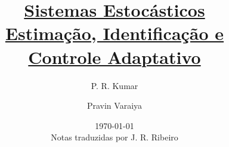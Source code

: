 \usepackage[T1]{fontenc}
\usepackage[utf8]{inputenc}
\usepackage[portuguese]{babel}
\usepackage[dvipsnames]{xcolor}
\usepackage[left=2cm,right=2cm,top=2cm,bottom=2cm]{geometry}
\usepackage{amsfonts,amssymb,amsmath,
txfonts,euler,
hyperref,
nomencl,
}
\usepackage[subnum]{cases}
\title{\href{http://cesg.tamu.edu/wp-content/uploads/2014/09/Kumar-Varaiya-Textbook.pdf}{Sistemas Estocásticos\\
Estimação, Identificação e \\
Controle Adaptativo}}
\author{P. R. Kumar \and Pravin Varaiya}
\date{\today\\Notas traduzidas por J. R. Ribeiro}
\setlength{\parindent}{12pt}
\setlength{\parskip}{12pt}
\hypersetup{
	colorlinks=true,
    linkcolor=Blue,
    citecolor=magenta,
    urlcolor=cyan,
}
\makenomenclature
\renewcommand{\nomname}{Abreviações e Símbolos}
\newtheorem{Teo}{Teorema}[chapter]
\newtheorem{Def}[Teo]{Definição}
\newtheorem{Obs}[Teo]{Observação}
\newtheorem{Lema}[Teo]{Lema}
\newtheorem{Ass}[Teo]{Assunção}
\newtheorem{Ex}[Teo]{Exemplo}
\newtheorem{Exercicio}[Teo]{Exercício}
\newenvironment{Dem}{\noindent\textbf{Demonstração}\\}
{

\vspace*{-\baselineskip}\noindent\hfill \large$\blacksquare$
}
\DeclareMathOperator{\@det}{\bf det}
\def\det{\@det}
\DeclareMathOperator{\E}{\bf E}
\DeclareMathOperator{\cov}{\bf cov}
\def\RR{\mathbb{R}}
\newcommand{\wt}{\widetilde}
\newcommand{\wh}{\widehat}
\newcommand{\wb}{\overline}

\maketitle
\printnomenclature
\tableofcontents
